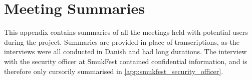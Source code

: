 \chapter{Meeting Summaries}\label{ch:appendix}
This appendix contains summaries of all the meetings held with potential users during the project. Summaries are provided in place of transcriptions, as the interviews were all conducted in Danish and had long durations. The interview with the security officer at SmukFest contained confidential information, and is therefore only cursorily summarised in \cref{app:smukfest_security_officer}.










